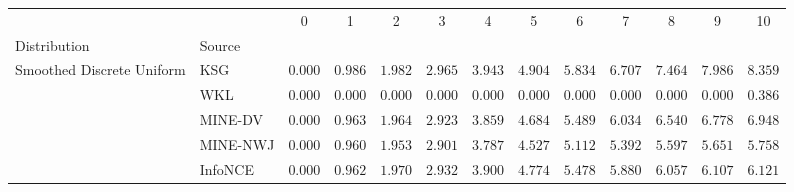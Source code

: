 \begin{tabular}{llccccccccccc}
\toprule
 &  & 0 & 1 & 2 & 3 & 4 & 5 & 6 & 7 & 8 & 9 & 10 \\
Distribution & Source &  &  &  &  &  &  &  &  &  &  &  \\
\midrule
\multirow[l]{5}{*}{Smoothed Discrete Uniform} & KSG & $ 0.000 $ & $ 0.986 $ & $ 1.982 $ & $ 2.965 $ & $ 3.943 $ & $ 4.904 $ & $ 5.834 $ & $ 6.707 $ & $ 7.464 $ & $ 7.986 $ & $ 8.359 $ \\
 & WKL & $ 0.000 $ & $ 0.000 $ & $ 0.000 $ & $ 0.000 $ & $ 0.000 $ & $ 0.000 $ & $ 0.000 $ & $ 0.000 $ & $ 0.000 $ & $ 0.000 $ & $ 0.386 $ \\
 & MINE-DV & $ 0.000 $ & $ 0.963 $ & $ 1.964 $ & $ 2.923 $ & $ 3.859 $ & $ 4.684 $ & $ 5.489 $ & $ 6.034 $ & $ 6.540 $ & $ 6.778 $ & $ 6.948 $ \\
 & MINE-NWJ & $ 0.000 $ & $ 0.960 $ & $ 1.953 $ & $ 2.901 $ & $ 3.787 $ & $ 4.527 $ & $ 5.112 $ & $ 5.392 $ & $ 5.597 $ & $ 5.651 $ & $ 5.758 $ \\
 & InfoNCE & $ 0.000 $ & $ 0.962 $ & $ 1.970 $ & $ 2.932 $ & $ 3.900 $ & $ 4.774 $ & $ 5.478 $ & $ 5.880 $ & $ 6.057 $ & $ 6.107 $ & $ 6.121 $ \\
\bottomrule
\end{tabular}
